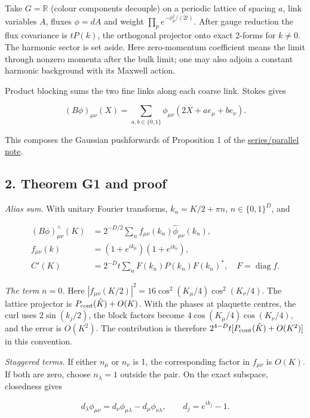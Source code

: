 \documentclass[11pt,a4paper]{article}
\begin{document}
Take \(G=\mathbb R\) (colour components decouple) on a periodic lattice
of spacing \(a\), link variables \(A\), fluxes \(\phi=dA\) and weight
\(\prod_p e^{-\phi_p^2/(2t)}\). After gauge reduction the flux
covariance is \(tP(k)\), the orthogonal projector onto exact 2-forms for
\(k\ne0\). The harmonic sector is set aside. Here zero-momentum
coefficient means the limit through nonzero momenta after the bulk
limit; one may also adjoin a constant harmonic background with its
Maxwell action.

Product blocking sums the two fine links along each coarse link. Stokes
gives

\[(B\phi)_{\mu\nu}(X)=\sum_{a,b\in\{0,1\}}
 \phi_{\mu\nu}(2X+ae_\mu+be_\nu).\]

This composes the Gaussian pushforwards of Proposition 1 of the
\href{series-parallel-gauge-refinement.md}{series/parallel note}.

\hypertarget{theorem-g1-and-proof}{%
\subsection{2. Theorem G1 and proof}\label{theorem-g1-and-proof}}

\emph{Alias sum.} With unitary Fourier transforms, \(k_n=K/2+\pi n\),
\(n\in\{0,1\}^D\), and

\[\begin{aligned}
 (B\phi)^\wedge_{\mu\nu}(K)
 &=2^{-D/2}\sum_n f_{\mu\nu}(k_n)\hat\phi_{\mu\nu}(k_n),\\
 f_{\mu\nu}(k)&=(1+e^{ik_\mu})(1+e^{ik_\nu}),\\
 C'(K)&=2^{-D}t\sum_n F(k_n)P(k_n)F(k_n)^*,
 \quad F=\operatorname{diag}f.
\end{aligned}\]

\emph{The term \(n=0\).} Here
\(|f_{\mu\nu}(K/2)|^2=16\cos^2(K_\mu/4)\cos^2(K_\nu/4)\). The lattice
projector is \(P_{\rm cont}(\hat K)+O(K)\). With the phases at plaquette
centres, the curl uses \(2\sin(k_j/2)\), the block factors become
\(4\cos(K_\mu/4)\cos(K_\nu/4)\), and the error is \(O(K^2)\). The
contribution is therefore \(2^{4-D}t[P_{\rm cont}(\hat K)+O(K^2)]\) in
this convention.

\emph{Staggered terms.} If either \(n_\mu\) or \(n_\nu\) is 1, the
corresponding factor in \(f_{\mu\nu}\) is \(O(K)\). If both are zero,
choose \(n_\lambda=1\) outside the pair. On the exact subspace,
closedness gives

\[d_\lambda\phi_{\mu\nu}
 =d_\nu\phi_{\mu\lambda}-d_\mu\phi_{\nu\lambda},
 \qquad d_j=e^{ik_j}-1.\]
\end{document}
